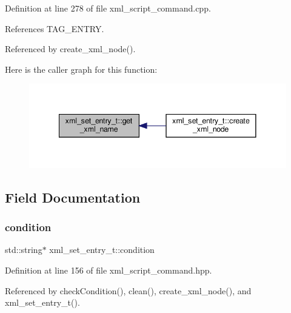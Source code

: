 Definition at line 278 of file xml\+\_\+script\+\_\+command.\+cpp.



References T\+A\+G\+\_\+\+E\+N\+T\+RY.



Referenced by create\+\_\+xml\+\_\+node().

Here is the caller graph for this function\+:
\nopagebreak
\begin{figure}[H]
\begin{center}
\leavevmode
\includegraphics[width=341pt]{d1/d5b/classxml__set__entry__t_a0a526ef7f3872e92b59a6f961b3383cf_icgraph}
\end{center}
\end{figure}


\subsection{Field Documentation}
\mbox{\label{classxml__set__entry__t_a81c2aba735a02aa3d388783a30fe104f}} 
\subsubsection{\texorpdfstring{condition}{condition}}
{\footnotesize\ttfamily std\+::string$\ast$ xml\+\_\+set\+\_\+entry\+\_\+t\+::condition}



Definition at line 156 of file xml\+\_\+script\+\_\+command.\+hpp.



Referenced by check\+Condition(), clean(), create\+\_\+xml\+\_\+node(), and xml\+\_\+set\+\_\+entry\+\_\+t().

\mbox{\label{classxml__set__entry__t_a910d6952281faf87b1c65c8b6f8ed926}} 
